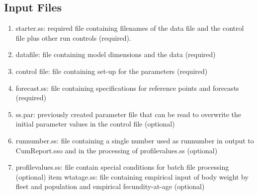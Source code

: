	\subsection{Input Files}
	\begin{enumerate}
		\item starter.ss:   required file containing filenames of the data file and the control file plus other run controls (required).
		\item datafile:  file containing model dimensions and the data (required)
		\item control file:  file containing set-up for the parameters (required)
		\item forecast.ss:  file containing specifications for reference points and forecasts (required) 
		\item ss.par:  previously created parameter file that can be read to overwrite the initial parameter values in the control file (optional)
		\item runnumber.ss:  file containing a single number used as runnumber in output to CumReport.sso and in the processing of profilevalues.ss (optional)
		\item profilevalues.ss:  file contain special conditions for batch file processing (optional)
		item wtatage.ss: file containing empirical input of body weight by fleet and population and empirical fecundity-at-age (optional)
	\end{enumerate}
	
